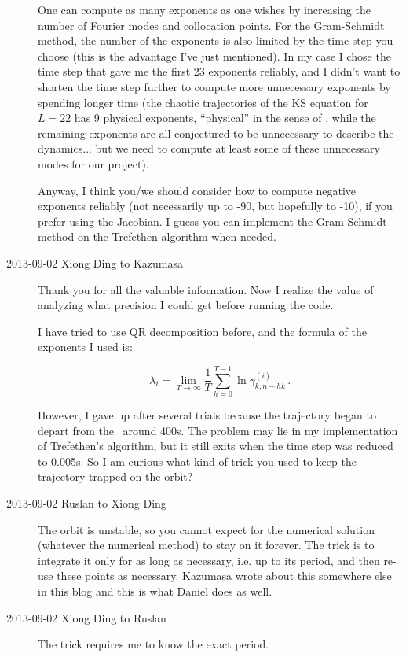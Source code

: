 \begin{description}
One can compute as many exponents as one wishes by increasing the number
 of Fourier modes and collocation points.
For the Gram-Schmidt method, the number of the exponents is also limited
 by the time step you choose (this is the advantage I've just mentioned).
In my case I chose the time step that gave me the first 23 exponents reliably,
 and I didn't want to shorten the time step further
 to compute more unnecessary exponents by spending longer time
 (the chaotic trajectories of the KS equation for $L=22$ has
 9 physical exponents,
 ``physical'' in the sense of ,
 while the remaining exponents are all conjectured to be
 unnecessary to describe the dynamics... but we need to compute
 at least some of these unnecessary modes for our project).

Anyway, I think you/we should consider
 how to compute negative exponents reliably
 (not necessarily up to -90, but hopefully to -10),
 if you prefer using the Jacobian.
I guess you can implement the Gram-Schmidt method
 on the Trefethen algorithm when needed.

 \item[2013-09-02 Xiong Ding to Kazumasa]
 Thank you for all the valuable information. Now I realize the value of
 analyzing what precision I could get before running the code.

 I have tried to
 use QR decomposition before, and
 the formula of the exponents I used is:

 \[
 \lambda_i=\lim_{T\to \infty} \frac{1}{T} \sum_{h=0}^{T-1}
  \ln\gamma_{k,n+hk}^{(i)}
 \,.
\]

However, I gave up after several trials because the trajectory began to
depart from the \po\ around 400s.
The problem may lie in my implementation of
Trefethen's algorithm, but it still exits when the time
step was reduced to 0.005s. So I am curious what kind of trick you used to keep the trajectory
trapped on the orbit?

\item[2013-09-02 Ruslan to Xiong Ding] The orbit is unstable, so you cannot expect
for the numerical solution (whatever the numerical method) to stay on it forever.
The trick is to integrate it only for as long as necessary, i.e. up to its period,
and then re-use these points as necessary.
Kazumasa wrote about this somewhere else in
this blog and this is what Daniel does as well.

\item[2013-09-02 Xiong Ding to Ruslan]
The trick requires me to know the exact period.


\end{description}
